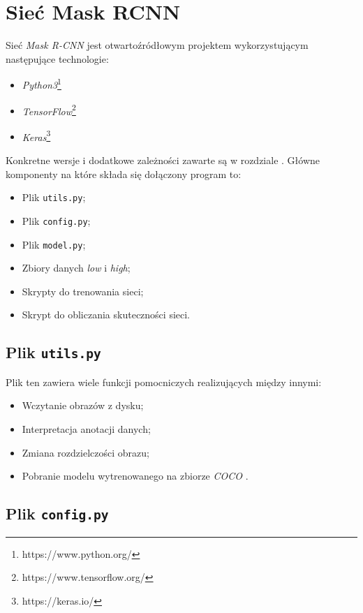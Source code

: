 \newpage
\section{Sieć Mask RCNN}

Sieć \textit{Mask R-CNN} \cite{matterport-mask-rcnn} jest otwartoźródłowym projektem wykorzystującym następujące technologie:
\begin{itemize}
  \item \textit{Python3}\footnote{https://www.python.org/}
  \item \textit{TensorFlow}\footnote{https://www.tensorflow.org/}
  \item \textit{Keras}\footnote{https://keras.io/}
\end{itemize}

Konkretne wersje i dodatkowe zależności zawarte są w rozdziale . Główne komponenty na które składa się dołączony program to:

\begin{itemize}
\item Plik \texttt{utils.py};
  \item Plik \texttt{config.py};
  \item Plik  \texttt{model.py};
  \item Zbiory danych \textit{low} i \textit{high};
  \item Skrypty do trenowania sieci;
  \item Skrypt do obliczania skuteczności sieci.
\end{itemize}

\subsection*{Plik \texttt{utils.py}}

Plik ten zawiera wiele funkcji pomocniczych realizujących między innymi:
\begin{itemize}
  \item Wczytanie obrazów z dysku;
  \item Interpretacja anotacji danych;
  \item Zmiana rozdzielczości obrazu;
  \item Pobranie modelu wytrenowanego na zbiorze \textit{COCO} \cite{coco}.
\end{itemize}

\subsection*{Plik \texttt{config.py}}

